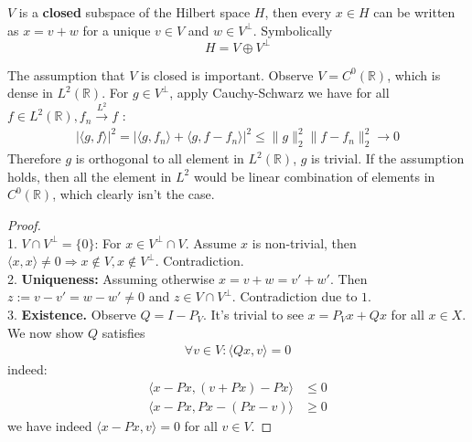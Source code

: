 \begin{theorem}
$V$ is a \textbf{closed} subspace of the Hilbert space $H$, then every $x \in H$ can be written as $x = v + w$ for a unique $v \in V$ and $w \in V^\perp$. Symbolically
\begin{equation*}
	H = V \oplus V^\perp
\end{equation*}
\end{theorem}
\begin{remark}
The assumption that $V$ is closed is important. Observe $V = C^0(\mathbb{R})$, which is dense in $L^2(\mathbb{R})$. For $g \in V^\perp$, apply Cauchy-Schwarz we have for all $f \in L^2(\mathbb{R}), f_n \overset{L^2}{\rightarrow} f$ :
\begin{align*}
	|\langle g, f\rangle|^2 = |\langle g, f_n \rangle + \langle g, f - f_n\rangle|^2 \le \|g\|_2^2 \|f - f_n\|_2^2 \rightarrow 0
\end{align*}	
Therefore $g$ is orthogonal to all element in $L^2(\mathbb{R})$, $g$ is trivial. If the assumption holds, then all the element in $L^2$ would be linear combination of elements in $C^0(\mathbb{R})$, which clearly isn't the case.
\end{remark}
\begin{proof}
	\quad\\ 1. $V \cap V^\perp = \{0\}$: For $x \in V^\perp \cap V$. Assume $x$ is non-trivial, then $\langle x , x \rangle \neq 0 \Rightarrow x \notin V, x \notin V^\perp$. Contradiction.\\
	2. \textbf{Uniqueness:} Assuming otherwise $x = v + w = v' + w'$. Then $z:= v - v' = w - w' \neq 0$ and $z \in V \cap V^\perp$. Contradiction due to $1$. \\
	3. \textbf{Existence.} Observe $Q = I - P_V$. It's trivial to see $x = P_Vx + Qx$ for all $x \in X$. We now show $Q$ satisfies 
	\begin{align*}
		\forall v \in V: \langle Qx, v\rangle = 0
	\end{align*}
	indeed:
	\begin{align*}
		\langle x - Px, (v + Px) - Px \rangle &\le 0\\
		\langle x - Px, Px - (Px - v) \rangle &\ge 0
	\end{align*}
	we have indeed $\langle x - Px, v \rangle = 0$ for all $v \in V$. 
\end{proof}

\begin{lemma}
	
\end{lemma}

